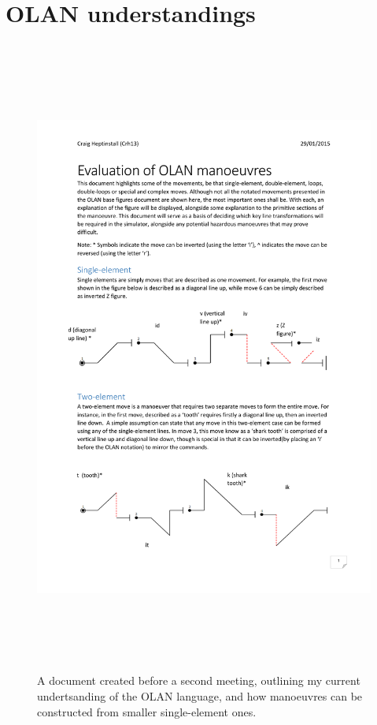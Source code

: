 \section{OLAN understandings}
\begin{figure}[h!]
	\centering
	\label{app:olan}
	\caption{A document created before a second meeting, outlining my current undertsanding of the OLAN language, and how manoeuvres can be constructed from smaller single-element ones.}
	\includegraphics[width=16cm,height=21cm,page=1]{images/eval.pdf}
\end{figure}

